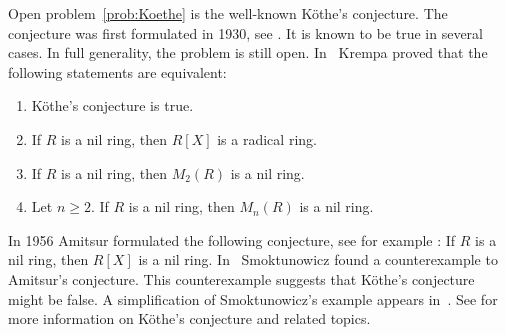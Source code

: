 Open problem~\ref{prob:Koethe} is the well-known K\"othe's conjecture. 
The conjecture was first formulated in 1930, see \cite{MR1545158}. It is known to be true
in several cases. In full generality, the problem is still open. In~\cite{MR306251} 
Krempa proved that
the following statements are equivalent:
\begin{enumerate}
    \item K\"othe's conjecture is true.  
    \item If $R$ is a nil ring, then $R[X]$ is a radical ring. 
    \item If $R$ is a nil ring, then $M_2(R)$ is a nil ring. 
    \item Let $n\geq2$. If $R$ is a nil ring, then $M_n(R)$ is a nil ring. 
\end{enumerate}

In 1956 Amitsur formulated the following conjecture, see for example
\cite{MR0347873}: If $R$ is a nil ring, then $R[X]$ is a nil ring. In~\cite{MR1793911} 
Smoktunowicz found a counterexample to Amitsur's conjecture. 
This counterexample suggests that K\"othe's conjecture might be false. 
A simplification of Smoktunowicz's example
appears in~\cite{MR3169522}. See \cite{MR1879880,MR2275597} for more
information on K\"othe's conjecture and related topics. 

